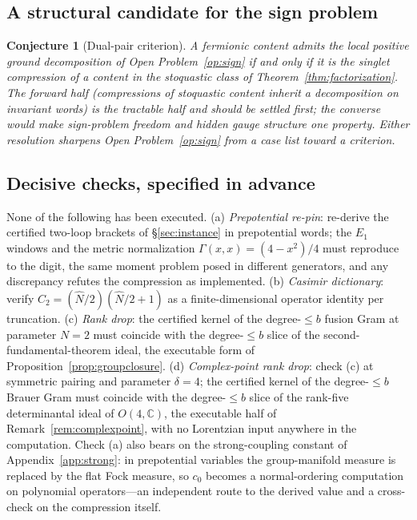\documentclass[11pt]{article}
\newtheorem{conjecture}[theorem]{Conjecture}
\theoremstyle{definition}
\theoremstyle{remark}
\begin{document}
\subsection{A structural candidate for the sign problem}
\begin{conjecture}[Dual-pair criterion]\label{conj:signfree}
A fermionic content admits the local positive ground decomposition of
Open Problem~\ref{op:sign} if and only if it is the singlet compression
of a content in the stoquastic class of
Theorem~\ref{thm:factorization}.  The forward half (compressions of
stoquastic content inherit a decomposition on invariant words) is the
tractable half and should be settled first; the converse would make
sign-problem freedom and hidden gauge structure one property.  Either
resolution sharpens Open Problem~\ref{op:sign} from a case list toward
a criterion.
\end{conjecture}

\subsection{Decisive checks, specified in advance}
None of the following has been executed.  (a) \emph{Prepotential
re-pin}: re-derive the certified two-loop brackets of
\S\ref{sec:instance} in prepotential words; the $E_1$ windows and the
metric normalization $\Gamma(x,x) = (4 - x^2)/4$ must reproduce to the
digit, the same moment problem posed in different generators, and any
discrepancy refutes the compression as implemented.  (b) \emph{Casimir
dictionary}: verify $C_2 = (\hat N/2)(\hat N/2 + 1)$ as a
finite-dimensional operator identity per truncation.  (c) \emph{Rank
drop}: the certified kernel of the degree-$\le b$ fusion Gram at
parameter $N = 2$ must coincide with the degree-$\le b$ slice of the
second-fundamental-theorem ideal, the executable form of
Proposition~\ref{prop:groupclosure}.  (d) \emph{Complex-point rank
drop}: check (c) at symmetric pairing and parameter $\delta = 4$; the
certified kernel of the degree-$\le b$ Brauer Gram must coincide with
the degree-$\le b$ slice of the rank-five determinantal ideal of
$O(4,\mathbb C)$, the executable half of
Remark~\ref{rem:complexpoint}, with no Lorentzian input anywhere in
the computation.  Check (a) also bears on
the strong-coupling constant of Appendix~\ref{app:strong}: in
prepotential variables the group-manifold measure is replaced by the
flat Fock measure, so $c_0$ becomes a normal-ordering computation on
polynomial operators---an independent route to the derived value and a
cross-check on the compression itself.
\end{document}
